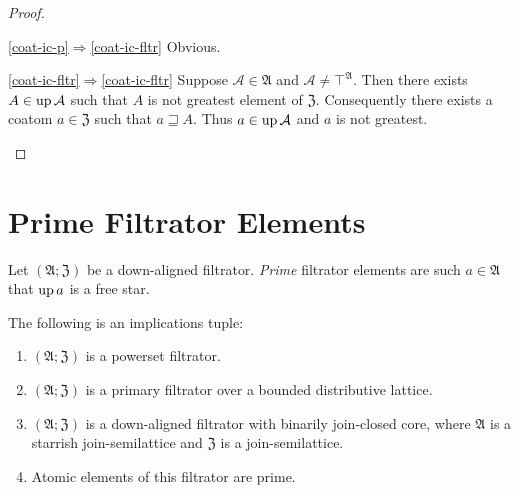 \begin{proof}
~
\begin{widedisorder}
\item [{\ref{coat-ic-p}$\Rightarrow$\ref{coat-ic-fltr}}] Obvious.
\item [{\ref{coat-ic-fltr}$\Rightarrow$\ref{coat-ic-fltr}}] Suppose
$\mathcal{A}\in\mathfrak{A}$ and $\mathcal{A}\neq\top^{\mathfrak{A}}$.
Then there exists $A\in\operatorname{up}\mathcal{A}$ such that $A$ is not greatest
element of $\mathfrak{Z}$. Consequently there exists a coatom $a\in\mathfrak{Z}$
such that $a\sqsupseteq A$. Thus $a\in\operatorname{up}\mathcal{A}$ and $a$ is
not greatest.
\end{widedisorder}
\end{proof}

\section{Prime Filtrator Elements}
\begin{defn}
Let $(\mathfrak{A};\mathfrak{Z})$ be a down-aligned
filtrator. \emph{Prime} filtrator elements are such $a\in\mathfrak{A}$
that $\operatorname{up} a$ is a free star.\end{defn}
\begin{prop}
\label{atom-is-prime}The following is an implications tuple:
\begin{enumerate}
\item \label{atom-is-prime-p}$(\mathfrak{A};\mathfrak{Z})$ is a powerset
filtrator.
\item \label{atom-is-prime-f}$(\mathfrak{A};\mathfrak{Z})$ is a primary
filtrator over a bounded distributive lattice.
\item \label{atom-is-prime-jlat}$(\mathfrak{A};\mathfrak{Z})$ is a down-aligned
filtrator with binarily join-closed core, where $\mathfrak{A}$ is
a starrish join-semilattice and $\mathfrak{Z}$ is a join-semilattice.
\item \label{atom-is-prime-conc}Atomic elements of this filtrator are prime.
\end{enumerate}
\end{prop}

